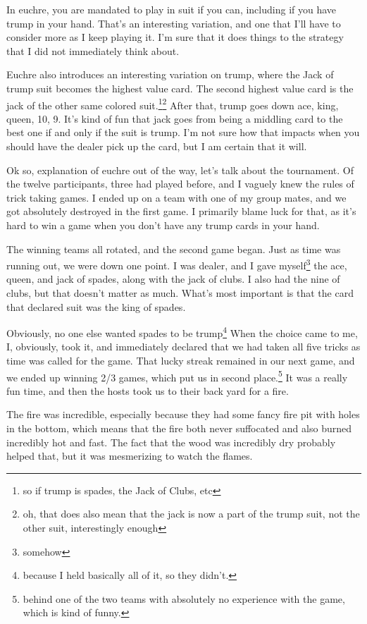 \documentclass[12pt]{article}[titlepage]
\newcommand{\1}{\={a}}
\newcommand{\2}{\={e}}
\newcommand{\3}{\={\i}}
\newcommand{\4}{\=o}
\newcommand{\5}{\=u}
\newcommand{\6}{\={A}}
\renewcommand{\,}{\textsuperscript{,}}
\begin{document}
In euchre, you are mandated to play in suit if you can, including if you have trump in your hand.
That's an interesting variation, and one that I'll have to consider more as I keep playing it.
I'm sure that it does things to the strategy that I did not immediately think about.

Euchre also introduces an interesting variation on trump, where the Jack of trump suit becomes the highest value card.
The second highest value card is the jack of the other same colored suit.\footnote{so if trump is spades, the Jack of Clubs, etc}\footnote{oh, that does also mean that the jack is now a part of the trump suit, not the other suit, interestingly enough}
After that, trump goes down ace, king, queen, 10, 9.
It's kind of fun that jack goes from being a middling card to the best one if and only if the suit is trump.
I'm not sure how that impacts when you should have the dealer pick up the card, but I am certain that it will.

Ok so, explanation of euchre out of the way, let's talk about the tournament.
Of the twelve participants, three had played before, and I vaguely knew the rules of trick taking games.
I ended up on a team with one of my group mates, and we got absolutely destroyed in the first game.
I primarily blame luck for that, as it's hard to win a game when you don't have any trump cards in your hand.

The winning teams all rotated, and the second game began.
Just as time was running out, we were down one point.
I was dealer, and I gave myself\footnote{somehow} the ace, queen, and jack of spades, along with the jack of clubs.
I also had the nine of clubs, but that doesn't matter as much.
What's most important is that the card that declared suit was the king of spades.

Obviously, no one else wanted spades to be trump\footnote{because I held basically all of it, so they didn't.}
When the choice came to me, I, obviously, took it, and immediately declared that we had taken all five tricks as time was called for the game.
That lucky streak remained in our next game, and we ended up winning 2/3 games, which put us in second place.\footnote{behind one of the two teams with absolutely no experience with the game, which is kind of funny.}
It was a really fun time, and then the hosts took us to their back yard for a fire.

The fire was incredible, especially because they had some fancy fire pit with holes in the bottom, which means that the fire both never suffocated and also burned incredibly hot and fast.
The fact that the wood was incredibly dry probably helped that, but it was mesmerizing to watch the flames.
\end{document}
